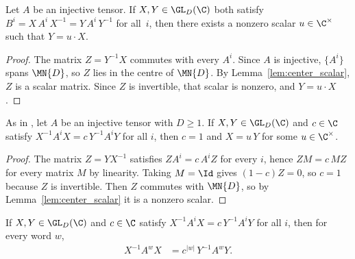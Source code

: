 \begin{lemma}\label{lem:gauge_unique_up_to_scalar}
    \leanok
    Let $A$ be an injective tensor.
    If $X,Y \in \GL_{D}(\C)$ both satisfy
    $B^i=X\,A^i\,X^{-1}=Y\,A^i\,Y^{-1}$
    for all~$i$, then there exists a nonzero scalar
    $u \in \C^{\times}$ such that $Y=u\cdot X$.
\end{lemma}

\begin{proof}\leanok{}
    The matrix $Z=Y^{-1}X$ commutes with every $A^i$.
    Since $A$ is injective, $\{A^i\}$ spans $\MN{D}$, so $Z$
    lies in the centre of $\MN{D}$.
    By Lemma~\ref{lem:center_scalar}, $Z$ is a scalar matrix.
    Since $Z$ is invertible, that scalar is nonzero, and
    $Y=u\cdot X$.
\end{proof}

\begin{lemma}\label{lem:gauge_phase_unique}
    \leanok
    As in \cite[Section~III.A]{Cirac2021Matrix}, let $A$ be an injective
    tensor with $D\ge1$.  If $X,Y\in\GL_{D}(\C)$ and $c\in\C$ satisfy
    $X^{-1}A^iX=c\,Y^{-1}A^iY$ for all $i$, then $c=1$ and $X=u\,Y$ for some
    $u\in\C^{\times}$.
\end{lemma}

\begin{proof}\leanok
    The matrix $Z=YX^{-1}$ satisfies $ZA^i=c\,A^iZ$ for every $i$, hence
    $ZM=c\,MZ$ for every matrix $M$ by linearity.  Taking $M=\Id$ gives
    $(1-c)Z=0$, so $c=1$ because $Z$ is invertible.  Then $Z$ commutes with
    $\MN{D}$, so by Lemma~\ref{lem:center_scalar} it is a nonzero scalar.
\end{proof}

\begin{lemma}\label{lem:gauge_phase_words}
    \leanok
    If $X,Y\in\GL_{D}(\C)$ and $c\in\C$ satisfy $X^{-1}A^iX=c\,Y^{-1}A^iY$
    for all $i$, then for every word $w$,
    \begin{align}
        X^{-1}A^wX & =c^{\lvert w\rvert}\,Y^{-1}A^wY.
        \label{eq:gauge_phase_words}
    \end{align}
\end{lemma}

